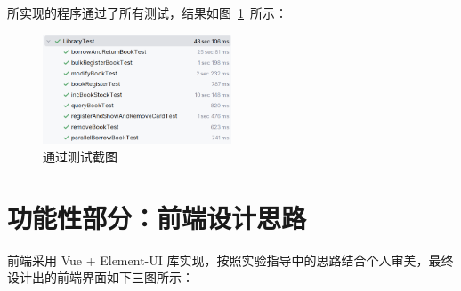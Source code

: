 \documentclass[a4paper,oneside]{ctexbook}
\begin{document}
所实现的程序通过了所有测试，结果如图~\ref{fig:test-pass}~所示：

\begin{figure}[!h]
    \centering
    \includegraphics[width=0.5\textwidth]{test.png}
    \caption{通过测试截图}
    \label{fig:test-pass}
\end{figure}

\section{功能性部分：前端设计思路}

前端采用 Vue + Element-UI 库实现，按照实验指导中的思路结合个人审美，最终设计出的前端界面如下三图所示：
\end{document}
